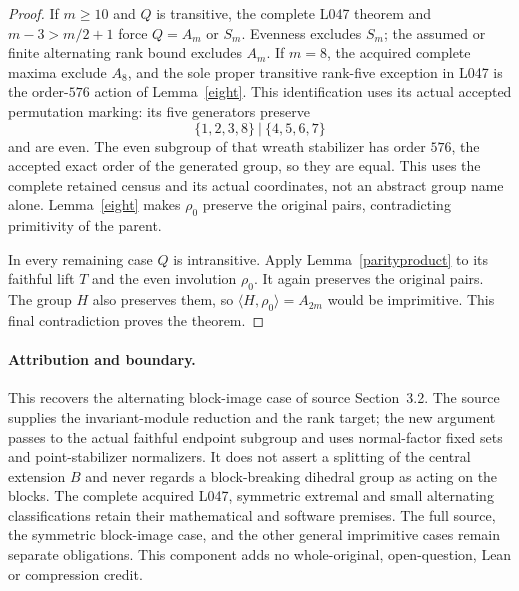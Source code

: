 \documentclass[11pt,a4paper]{article}
\newcommand{\gen}[1]{\langle#1\rangle}
\begin{document}
\begin{proof}
If $m\ge10$ and $Q$ is transitive, the complete L047 theorem
and $m-3>m/2+1$ force $Q=A_m$ or $S_m$. Evenness excludes
$S_m$; the assumed or finite alternating rank bound excludes
$A_m$. If $m=8$, the acquired complete maxima exclude
$A_8$, and the sole proper transitive rank-five exception
in L047 is the order-$576$ action of Lemma~\ref{eight}.
This identification uses its actual accepted permutation
marking: its five generators preserve
\[
             \{1,2,3,8\}\ \big|\ \{4,5,6,7\}
\]
and are even. The even subgroup of that wreath stabilizer
has order $576$, the accepted exact order of the generated
group, so they are equal. This uses the complete retained
census and its actual coordinates, not an abstract group
name alone. Lemma~\ref{eight} makes $\rho_0$ preserve the
original pairs, contradicting primitivity of the parent.

In every remaining case $Q$ is intransitive. Apply
Lemma~\ref{parityproduct} to its faithful lift $T$ and the
even involution $\rho_0$. It again preserves the original
pairs. The group $H$ also preserves them, so
$\gen{H,\rho_0}=A_{2m}$ would be imprimitive. This final
contradiction proves the theorem.
\end{proof}

\paragraph{Attribution and boundary.}
This recovers the alternating block-image case of source Section~3.2.
The source supplies the invariant-module reduction and the rank target;
the new argument passes to the actual faithful endpoint subgroup and
uses normal-factor fixed sets and point-stabilizer normalizers.
It does not assert a splitting of the central extension $B$ and never
regards a block-breaking dihedral group as acting on the blocks.
The complete acquired L047, symmetric extremal and small alternating
classifications retain their mathematical and software premises.
The full source, the symmetric block-image case, and the other general
imprimitive cases remain separate obligations. This component adds no
whole-original, open-question, Lean or compression credit.
\end{document}
